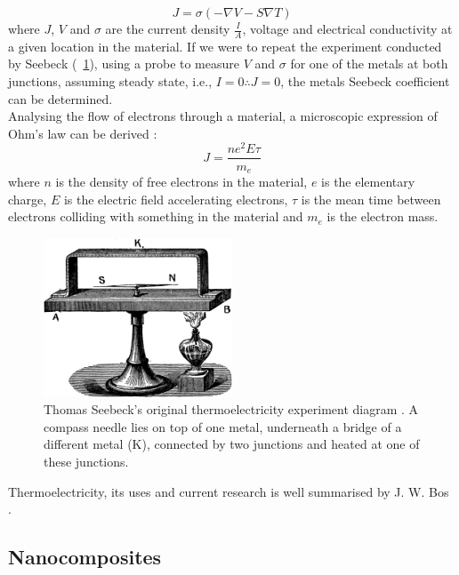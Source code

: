 \documentclass[a4paper,10pt,journal]{IEEEtran}
\newcommand{\figref}[2][\figurename~]{#1\ref{#2}}
\begin{document}
\begin{equation}
\label{current-density}
	J = \sigma (-\nabla V - S \nabla T)
\end{equation}
where $J$, $V$ and $\sigma$ are the current density $\frac{I}{A}$,
voltage and electrical conductivity at a given location in the
material. If we were to repeat the experiment conducted by Seebeck
(\figref{seebeck-experiment}), using a probe to measure $V$ and
$\sigma$ for one of the metals at both junctions, assuming steady state,
i.e., $I=0 \therefore J = 0$, the metals Seebeck coefficient can be
determined.\\
Analysing the flow of electrons through a material, a microscopic
expression of Ohm's law can be derived \cite{kittel}:
\begin{equation}
\label{micro-ohm}
	J = \frac{ne^2E \tau}{m_e}
\end{equation}
where $n$ is the density of free electrons in the material, $e$ is the
elementary charge, $E$ is the electric field accelerating
electrons, $\tau$ is the mean time between electrons colliding with
something in the material and $m_e$ is the electron mass.

\begin{figure}
	\centering
	\includegraphics[width=0.5\textwidth]{seebeck-experiment-black.png}
	\caption{Thomas Seebeck's original thermoelectricity experiment
	diagram \cite{seebeck-original}. A compass needle lies on top of
	one metal, underneath a bridge of a different metal (K), connected
	by two junctions and heated at one of these junctions.}
	\label{seebeck-experiment}
\end{figure}

Thermoelectricity, its uses and current research is well summarised by
J. W. Bos \cite{rsc-eic}.

\subsection{Nanocomposites}
\end{document}
